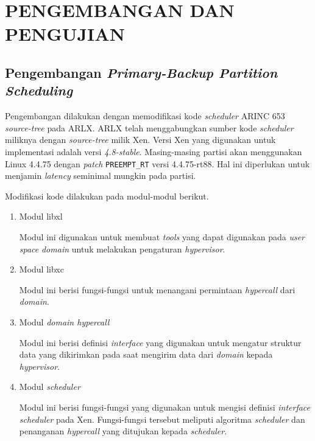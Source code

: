 \chapter{PENGEMBANGAN DAN PENGUJIAN}

\section{Pengembangan \textit{Primary-Backup Partition Scheduling}}
\label{section:implementasi}

Pengembangan dilakukan dengan memodifikasi kode \textit{scheduler} ARINC 653
\textit{source-tree} pada ARLX. ARLX telah menggabungkan sumber kode \textit{scheduler} miliknya
dengan \textit{source-tree} milik Xen. Versi Xen yang digunakan untuk implementasi adalah versi
\textit{4.8-stable}.  Masing-masing partisi akan menggunakan Linux 4.4.75 dengan \textit{patch}
\texttt{PREEMPT\_RT} versi 4.4.75-rt88. Hal ini diperlukan untuk menjamin \textit{latency}
seminimal mungkin pada partisi.

Modifikasi kode dilakukan pada modul-modul berikut.

\begin{enumerate}

	\item Modul libxl

	Modul ini digunakan untuk membuat \textit{tools} yang dapat digunakan pada \textit{user
	space} \textit{domain}  untuk melakukan pengaturan \textit{hypervisor}.

	\item Modul libxc

	Modul ini berisi fungsi-fungsi untuk menangani permintaan \textit{hypercall} dari
	\textit{domain}.

	\item Modul \textit{domain hypercall}

	Modul ini berisi definisi \textit{interface} yang digunakan untuk mengatur struktur data
	yang dikirimkan pada saat mengirim data dari \textit{domain} kepada \textit{hypervisor}.

	\item Modul \textit{scheduler}

	Modul ini berisi fungsi-fungsi yang digunakan untuk mengisi definisi \textit{interface}
	\textit{scheduler} pada Xen. Fungsi-fungsi tersebut meliputi algoritma
	\textit{scheduler} dan penanganan \textit{hypercall} yang ditujukan kepada
	\textit{scheduler}.

\end{enumerate}

